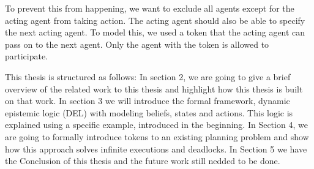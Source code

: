 To prevent this from happening, we want to exclude all agents except for the acting agent from taking action. The acting agent should also be able to specify the next acting agent. To model this, we used a token that the acting agent can pass on to the next agent. Only the agent with the token  is allowed to participate.






This thesis is structured as follows:
In section 2, we are going to give a brief overview of the related work to this thesis and highlight how this thesis is built on that work. In section 3 we will introduce the formal framework, dynamic epistemic logic (DEL) with modeling beliefs, states and actions. This logic is explained using a specific example, introduced in the beginning. In Section 4, we are going to formally introduce tokens to an existing planning problem and show how this approach solves infinite executions and deadlocks. In Section 5 we have the Conclusion of this thesis and the future work still nedded to be done.
